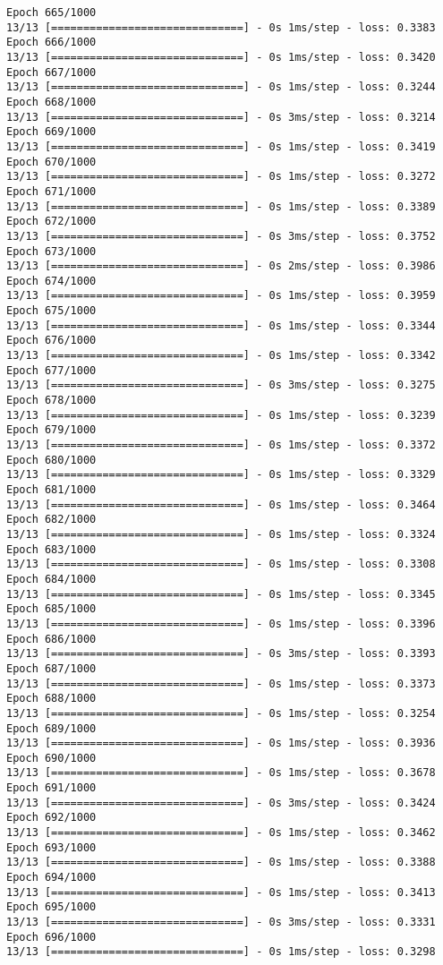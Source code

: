 \documentclass[11pt]{article}
\begin{document}
\begin{Verbatim}[commandchars=\\\{\}]
Epoch 665/1000
13/13 [==============================] - 0s 1ms/step - loss: 0.3383
Epoch 666/1000
13/13 [==============================] - 0s 1ms/step - loss: 0.3420
Epoch 667/1000
13/13 [==============================] - 0s 1ms/step - loss: 0.3244
Epoch 668/1000
13/13 [==============================] - 0s 3ms/step - loss: 0.3214
Epoch 669/1000
13/13 [==============================] - 0s 1ms/step - loss: 0.3419
Epoch 670/1000
13/13 [==============================] - 0s 1ms/step - loss: 0.3272
Epoch 671/1000
13/13 [==============================] - 0s 1ms/step - loss: 0.3389
Epoch 672/1000
13/13 [==============================] - 0s 3ms/step - loss: 0.3752
Epoch 673/1000
13/13 [==============================] - 0s 2ms/step - loss: 0.3986
Epoch 674/1000
13/13 [==============================] - 0s 1ms/step - loss: 0.3959
Epoch 675/1000
13/13 [==============================] - 0s 1ms/step - loss: 0.3344
Epoch 676/1000
13/13 [==============================] - 0s 1ms/step - loss: 0.3342
Epoch 677/1000
13/13 [==============================] - 0s 3ms/step - loss: 0.3275
Epoch 678/1000
13/13 [==============================] - 0s 1ms/step - loss: 0.3239
Epoch 679/1000
13/13 [==============================] - 0s 1ms/step - loss: 0.3372
Epoch 680/1000
13/13 [==============================] - 0s 1ms/step - loss: 0.3329
Epoch 681/1000
13/13 [==============================] - 0s 1ms/step - loss: 0.3464
Epoch 682/1000
13/13 [==============================] - 0s 1ms/step - loss: 0.3324
Epoch 683/1000
13/13 [==============================] - 0s 1ms/step - loss: 0.3308
Epoch 684/1000
13/13 [==============================] - 0s 1ms/step - loss: 0.3345
Epoch 685/1000
13/13 [==============================] - 0s 1ms/step - loss: 0.3396
Epoch 686/1000
13/13 [==============================] - 0s 3ms/step - loss: 0.3393
Epoch 687/1000
13/13 [==============================] - 0s 1ms/step - loss: 0.3373
Epoch 688/1000
13/13 [==============================] - 0s 1ms/step - loss: 0.3254
Epoch 689/1000
13/13 [==============================] - 0s 1ms/step - loss: 0.3936
Epoch 690/1000
13/13 [==============================] - 0s 1ms/step - loss: 0.3678
Epoch 691/1000
13/13 [==============================] - 0s 3ms/step - loss: 0.3424
Epoch 692/1000
13/13 [==============================] - 0s 1ms/step - loss: 0.3462
Epoch 693/1000
13/13 [==============================] - 0s 1ms/step - loss: 0.3388
Epoch 694/1000
13/13 [==============================] - 0s 1ms/step - loss: 0.3413
Epoch 695/1000
13/13 [==============================] - 0s 3ms/step - loss: 0.3331
Epoch 696/1000
13/13 [==============================] - 0s 1ms/step - loss: 0.3298

\end{Verbatim}
\end{document}
